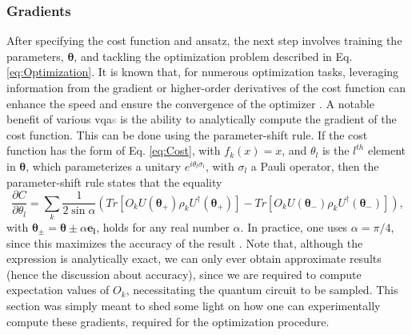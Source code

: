 \subsubsection*{\small Gradients}
After specifying the cost function and ansatz, the next step involves training the parameters, $\boldsymbol{\theta}$, and tackling the optimization problem described in Eq. \ref{eq:Optimization}. It is known that, for numerous optimization tasks, leveraging information from the gradient or higher-order derivatives of the cost function can enhance the speed and ensure the convergence of the optimizer \cite{Cerezo_2021}. A notable benefit of various \acrshort{vqa}\textcolor{gray}{s} is the ability to analytically compute the gradient of the cost function. This can be done using the parameter-shift rule. If the cost function has the form of Eq. \ref{eq:Cost}, with $f_k(x) = x$, and $\theta_l$ is the $l^{th}$ element in $\boldsymbol{\theta}$, which parameterizes a unitary $e^{i\theta_l \sigma_l}$, with $\sigma_l$ a Pauli operator, then the parameter-shift rule states that the equality
\begin{equation}
    \frac{\partial C}{\partial \theta_l} = \sum_k \frac{1}{2\sin{\alpha}}\left(Tr\left[O_k U(\boldsymbol{\theta_+}) \rho_k U^{\dagger}(\boldsymbol{\theta_+})\right] - Tr\left[O_k U(\boldsymbol{\theta_-}) \rho_k U^{\dagger}(\boldsymbol{\theta_-})\right]\right),
\end{equation}
with $\boldsymbol{\theta_{\pm}} = \boldsymbol{\theta} \pm \alpha \boldsymbol{e_l}$, holds for any real number $\alpha$. In practice, one uses $\alpha = \pi/4$, since this maximizes the accuracy of the result \cite{Cerezo_2021}. Note that, although the expression is analytically exact, we can only ever obtain approximate results (hence the discussion about accuracy), since we are required to compute expectation values of $O_k$, necessitating the quantum circuit to be sampled. This section was simply meant to shed some light on how one can experimentally compute these gradients, required for the optimization procedure.

